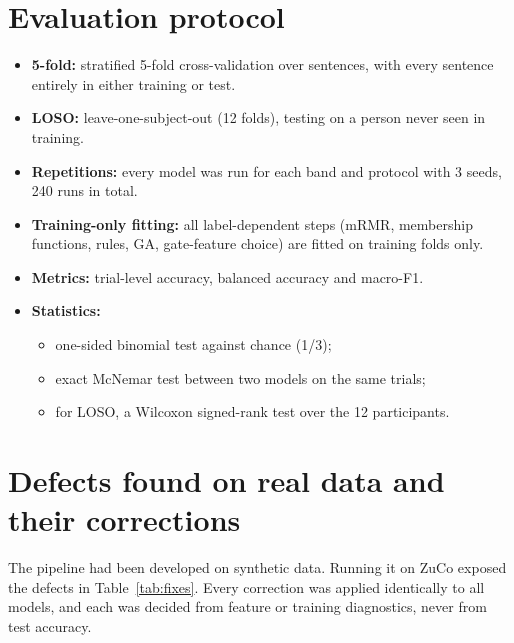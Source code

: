 \documentclass[10pt,a4paper]{article}
\begin{document}
\section{Evaluation protocol}
\begin{itemize}
  \item \textbf{5-fold:} stratified 5-fold cross-validation over sentences, with every sentence entirely in either training or test.
  \item \textbf{LOSO:} leave-one-subject-out (12 folds), testing on a person never seen in training.
  \item \textbf{Repetitions:} every model was run for each band and protocol with 3 seeds, 240 runs in total.
  \item \textbf{Training-only fitting:} all label-dependent steps (mRMR, membership functions, rules, GA, gate-feature choice) are fitted on training folds only.
  \item \textbf{Metrics:} trial-level accuracy, balanced accuracy and macro-F1.
  \item \textbf{Statistics:}
    \begin{itemize}
      \item one-sided binomial test against chance (1/3);
      \item exact McNemar test between two models on the same trials;
      \item for LOSO, a Wilcoxon signed-rank test over the 12 participants.
    \end{itemize}
\end{itemize}

\section{Defects found on real data and their corrections}\label{sec:fixes}
The pipeline had been developed on synthetic data. Running it on ZuCo exposed the defects in Table~\ref{tab:fixes}. Every correction was applied identically to all models, and each was decided from feature or training diagnostics, never from test accuracy.
\end{document}
